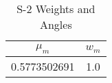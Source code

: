 
\begin{table}[h!]
    \caption{S-2 Weights and Angles}
    \label{tb:s2quad}
    \centering
    \begin{tabular}{cc}
        \toprule
        $\mu_m$ & $w_m$ \\
        \midrule
        0.5773502691 & 1.0 \\
        \bottomrule
    \end{tabular}
\end{table}